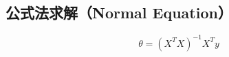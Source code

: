 \subsection{公式法求解（Normal Equation）}
\begin{equation}
	\theta = (X^T X)^{-1} X^T y
\end{equation}















